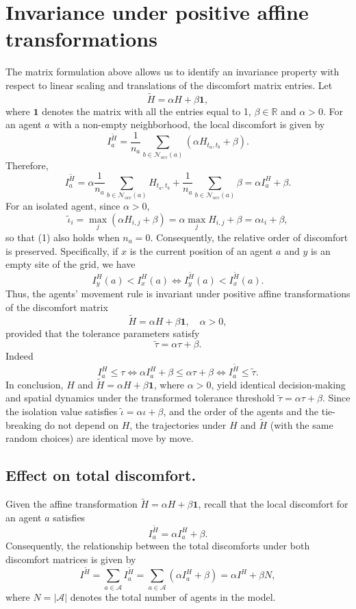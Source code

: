 \documentclass{article}
\theoremstyle{remark}
\begin{document}
\section{Invariance under positive affine transformations}
The matrix formulation above allows us to identify an invariance property with respect to linear scaling and translations of the discomfort matrix entries. Let
\[
\widetilde H=\alpha H+\beta \textbf{1},
\]
where $\textbf{1}$ denotes the matrix with all the entries equal to 1, $\beta \in \mathbb R$ and $\alpha > 0.$ For an agent $a$ with a non-empty neighborhood, the local discomfort is given by
\[
I_a^{\widetilde{H}} = \frac{1}{n_a} \sum_{b \in \mathcal{N}_{\mathrm{occ}}(a)} (\alpha H_{t_a, t_b} + \beta).
\]
Therefore,
\[
I_a^{\widetilde{H}} = \alpha \frac{1}{n_a} \sum_{b \in \mathcal{N}_{\mathrm{occ}}(a)} H_{t_a, t_b} + \frac{1}{n_a} \sum_{b \in \mathcal{N}_{\mathrm{occ}}(a)} \beta = \alpha I_a^H + \beta . \tag{1}
\]
For an isolated agent, since $\alpha>0$,
\[
\widetilde\iota_i=\max_j\left(\alpha H_{i,j}+\beta\right)=\alpha\max_j H_{i,j}+\beta=\alpha\iota_i+\beta,
\]
so that (1) also holds when $n_a=0$. Consequently, the relative order of discomfort is preserved. Specifically, if $x$ is the current position of an agent $a$ and $y$ is an empty site of the grid, we have
\[
I_y^H(a) < I_x^H(a) \iff I_y^{\widetilde{H}}(a) < I_x^{\widetilde{H}}(a).
\]
Thus, the agents' movement rule is invariant under positive affine transformations of the discomfort matrix
\[
\widetilde{H} = \alpha H + \beta \textbf{1}, \quad \alpha > 0,
\]
provided that the tolerance parameters satisfy
\[
\widetilde{\tau} = \alpha \tau + \beta.
\]
Indeed
\[
I_a^H \le \tau \iff \alpha I_a^H + \beta \le \alpha \tau + \beta \iff I_a^{\widetilde{H}} \le \widetilde{\tau}.
\]
In conclusion, $H$ and $\widetilde H = \alpha H + \beta \textbf{1}$, where $\alpha>0$, yield identical decision-making and spatial dynamics under the transformed tolerance threshold $\widetilde \tau = \alpha \tau + \beta.$ Since the isolation value satisfies $\widetilde\iota=\alpha\iota+\beta$, and the order of the agents and the tie-breaking do not depend on $H$, the trajectories under $H$ and $\widetilde H$ (with the same random choices) are identical move by move.

\subsection{Effect on total discomfort.}
Given the affine transformation $\widetilde{H} = \alpha H + \beta \mathbf{1}$, recall that the local discomfort for an agent $a$ satisfies
\[
I_a^{\widetilde{H}} = \alpha I_a^H + \beta .
\]
Consequently, the relationship between the total discomforts under both discomfort matrices is given by
\[
I^{\widetilde{H}} = \sum_{a \in \mathcal{A}} I_a^{\widetilde{H}} = \sum_{a \in \mathcal{A}} (\alpha I_a^H + \beta) = \alpha I^H + \beta N,
\]
where $N = |\mathcal{A}|$ denotes the total number of agents in the model.
\end{document}
